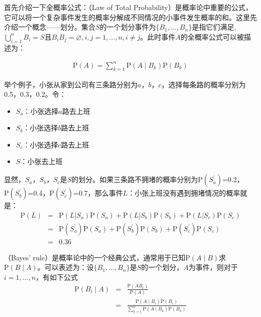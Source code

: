 \parinterval 首先介绍一下全概率公式：{\small{}}（Law of Total Probability）是概率论中重要的公式，它可以将一个复杂事件发生的概率分解成不同情况的小事件发生概率的和。这里先介绍一个概念——划分。集合$S$的一个划分事件为$\{B_1,...,B_n\}$是指它们满足,$\bigcup_{i=1}^n B_i=S \textrm{且}B_iB_j=\varnothing , i,j=1,...,n,i\neq j$。此时事件$A$的全概率公式可以被描述为：

\begin{eqnarray}
\textrm{P}(A)=\sum_{k=1}^n \textrm{P}(A \mid B_k)\textrm{P}(B_k)
\label{eq:2-9}
\end{eqnarray}

\parinterval 举个例子，小张从家到公司有三条路分别为$a$，$b$，$c$，选择每条路的概率分别为0.5，0.3，0.2。令：

\begin{itemize}
\vspace{0.5em}
\item $S_a$：小张选择$a$路去上班
\vspace{0.5em}
\item $S_b$：小张选择$b$路去上班
\vspace{0.5em}
\item $S_c$：小张选择$c$路去上班
\vspace{0.5em}
\item $S$：小张去上班
\vspace{0.5em}
\end{itemize}

\parinterval 显然，$S_a$，$S_b$，$S_c$是$S$的划分。如果三条路不拥堵的概率分别为$\textrm{P}({S_{a}^{'}})$=0.2， $\textrm{P}({S_{b}^{'}})$=0.4，$\textrm{P}({S_{c}^{'}})$=0.7，那么事件$L$：小张上班没有遇到拥堵情况的概率就是：
\begin{eqnarray}
{\textrm{P}(L)} &=& {\textrm{P}( L| S_a )\textrm{P}(S_a )+\textrm{P}( L| S_b )\textrm{P}(S_b )+\textrm{P}( L| S_c )\textrm{P}(S_c )}\nonumber \\
& = &{\textrm{P}({S_{a}^{'}})\textrm{P}(S_a)+\textrm{P}({S_{b}^{'}})\textrm{P}(S_b)+\textrm{P}({S_{c}^{'}})\textrm{P}(S_c) }\nonumber \\
& = &{0.36}
\label{eq:2-10}
\end{eqnarray}

（Bayes' rule）是概率论中的一个经典公式，通常用于已知$\textrm{P}(A \mid B)$求$\textrm{P}(B \mid A)$。可以表述为：设$\{B_1,...,B_n\}$是$S$的一个划分，$A$为事件，则对于$i=1,...,n$，有如下公式
\begin{eqnarray}
\textrm{P}(B_i \mid A) & = & \frac {\textrm{P}(A  B_i)} { \textrm{P}(A) } \nonumber \\
                                   & = & \frac {\textrm{P}(A \mid B_i)\textrm{P}(B_i) } { \sum_{k=1}^n\textrm{P}(A \mid B_k)\textrm{P}(B_k) }
\label{eq:2-11}
\end{eqnarray}

